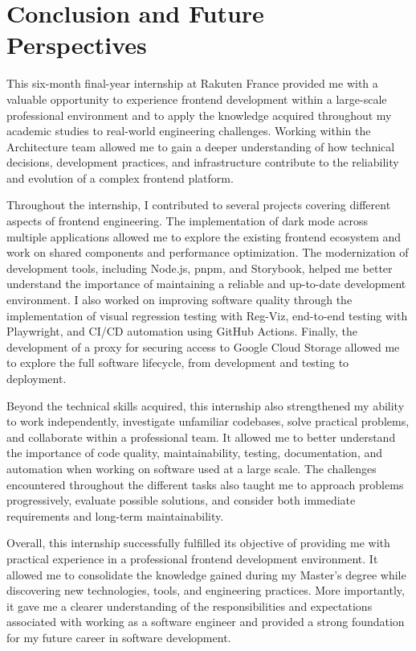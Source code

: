 \chapter*{Conclusion and Future Perspectives}

This six-month final-year internship at Rakuten France provided me with a valuable opportunity to experience frontend development within a large-scale professional environment and to apply the knowledge acquired throughout my academic studies to real-world engineering challenges. Working within the Architecture team allowed me to gain a deeper understanding of how technical decisions, development practices, and infrastructure contribute to the reliability and evolution of a complex frontend platform.

Throughout the internship, I contributed to several projects covering different aspects of frontend engineering. The implementation of dark mode across multiple applications allowed me to explore the existing frontend ecosystem and work on shared components and performance optimization. The modernization of development tools, including Node.js, pnpm, and Storybook, helped me better understand the importance of maintaining a reliable and up-to-date development environment. I also worked on improving software quality through the implementation of visual regression testing with Reg-Viz, end-to-end testing with Playwright, and CI/CD automation using GitHub Actions. Finally, the development of a proxy for securing access to Google Cloud Storage allowed me to explore the full software lifecycle, from development and testing to deployment.

Beyond the technical skills acquired, this internship also strengthened my ability to work independently, investigate unfamiliar codebases, solve practical problems, and collaborate within a professional team. It allowed me to better understand the importance of code quality, maintainability, testing, documentation, and automation when working on software used at a large scale. The challenges encountered throughout the different tasks also taught me to approach problems progressively, evaluate possible solutions, and consider both immediate requirements and long-term maintainability.

Overall, this internship successfully fulfilled its objective of providing me with practical experience in a professional frontend development environment. It allowed me to consolidate the knowledge gained during my Master's degree while discovering new technologies, tools, and engineering practices. More importantly, it gave me a clearer understanding of the responsibilities and expectations associated with working as a software engineer and provided a strong foundation for my future career in software development.
